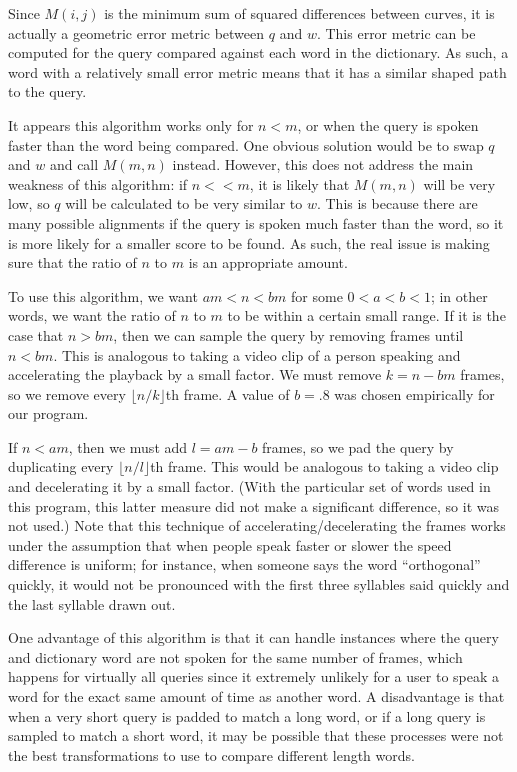 \documentclass[10pt,twocolumn,letterpaper]{article}
\begin{document}
Since $M(i, j)$ is the minimum sum of squared differences between curves, it is actually a geometric error metric between $q$ and $w$.  This error metric can be computed for the query compared against each word in the dictionary. As such, a word with a relatively small error metric means that it has a similar shaped path to the query.

It appears this algorithm works only for $n < m$, or when the query is spoken faster than the word being compared. One obvious solution would be to swap $q$ and $w$ and call $M(m, n)$ instead. However, this does not address the main weakness of this algorithm: if $n << m$, it is likely that $M(m, n)$ will be very low, so $q$ will be calculated to be very similar to $w$.  This is because there are many possible alignments if the query is spoken much faster than the word, so it is more likely for a smaller score to be found. As such, the real issue is making sure that the ratio of $n$ to $m$ is an appropriate amount.

To use this algorithm, we want $am<n<bm$ for some $0<a<b<1$; in other words, we want the ratio of $n$ to $m$ to be within a certain small range. If it is the case that $n>bm$, then we can sample the query by removing frames until $n<bm$. This is analogous to taking a video clip of a person speaking and accelerating the playback by a small factor. We must remove $k=n-bm$ frames, so we remove every $\lfloor n/k  \rfloor$th frame. A value of $b=.8$ was chosen empirically for our program.

If $n<am$, then we must add $l=am-b$ frames, so we pad the query by duplicating every $\lfloor n/l \rfloor$th frame. This would be analogous to taking a video clip and decelerating it by a small factor. (With the particular set of words used in this program, this latter measure did not make a significant difference, so it was not used.) Note that this technique of accelerating/decelerating the frames works under the assumption that when people speak faster or slower the speed difference is uniform; for instance, when someone says the word “orthogonal” quickly, it would not be pronounced with the first three syllables said quickly and the last syllable drawn out.

One advantage of this algorithm is that it can handle instances where the query and dictionary word are not spoken for the same number of frames, which happens for virtually all queries since it extremely unlikely for a user to speak a word for the exact same amount of time as another word. A disadvantage is that when a very short query is padded to match a long word, or if a long query is sampled to match a short word, it may be possible that these processes were not the best transformations to use to compare different length words.
\end{document}
